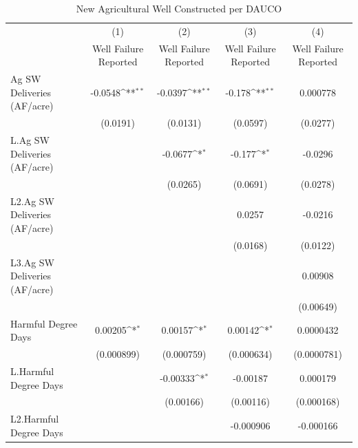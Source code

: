 \begin{table}[htbp]\centering
\def\sym#1{\ifmmode^{#1}\else\(^{#1}\)\fi}
\caption{New Agricultural Well Constructed per DAUCO}
\begin{tabular}{l*{4}{c}}
\hline\hline
                    &\multicolumn{1}{c}{(1)}&\multicolumn{1}{c}{(2)}&\multicolumn{1}{c}{(3)}&\multicolumn{1}{c}{(4)}\\
                    &\multicolumn{1}{c}{Well Failure Reported}&\multicolumn{1}{c}{Well Failure Reported}&\multicolumn{1}{c}{Well Failure Reported}&\multicolumn{1}{c}{Well Failure Reported}\\
\hline
Ag SW Deliveries (AF/acre)&     -0.0548\sym{**} &     -0.0397\sym{**} &      -0.178\sym{**} &    0.000778         \\
                    &    (0.0191)         &    (0.0131)         &    (0.0597)         &    (0.0277)         \\
[1em]
L.Ag SW Deliveries (AF/acre)&                     &     -0.0677\sym{*}  &      -0.177\sym{*}  &     -0.0296         \\
                    &                     &    (0.0265)         &    (0.0691)         &    (0.0278)         \\
[1em]
L2.Ag SW Deliveries (AF/acre)&                     &                     &      0.0257         &     -0.0216         \\
                    &                     &                     &    (0.0168)         &    (0.0122)         \\
[1em]
L3.Ag SW Deliveries (AF/acre)&                     &                     &                     &     0.00908         \\
                    &                     &                     &                     &   (0.00649)         \\
[1em]
Harmful Degree Days &     0.00205\sym{*}  &     0.00157\sym{*}  &     0.00142\sym{*}  &   0.0000432         \\
                    &  (0.000899)         &  (0.000759)         &  (0.000634)         & (0.0000781)         \\
[1em]
L.Harmful Degree Days&                     &    -0.00333\sym{*}  &    -0.00187         &    0.000179         \\
                    &                     &   (0.00166)         &   (0.00116)         &  (0.000168)         \\
[1em]
L2.Harmful Degree Days&                     &                     &   -0.000906         &   -0.000166         \\

\end{tabular}
\end{table}
